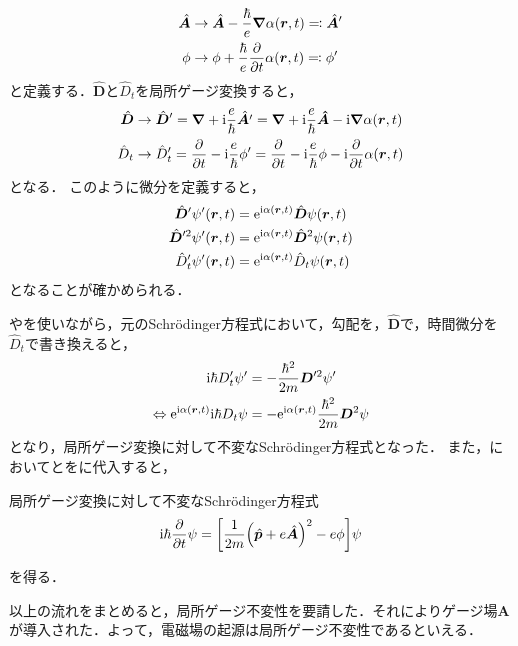 \documentclass{report}
\begin{document}
  \begin{align}
    \hat{\bm{A}} &\to \hat{\bm{A}} - \frac{\hbar}{e}\grad\alpha(\bm{r}, t) \eqqcolon \hat{\bm{A}}' \\ 
    \phi &\to \phi + \frac{\hbar}{e}\pdv{t}\alpha(\bm{r}, t) \eqqcolon \phi'  
  \end{align}
  と定義する．$\hat{\bm{D}}$と$\hat{D}_t$を局所ゲージ変換すると，
  \begin{align}
    \hat{\bm{D}} &\to \hat{\bm{D}}' = \grad + \mathrm{i}\frac{e}{\hbar}\hat{\bm{A}'} = \grad + \mathrm{i}\frac{e}{\hbar}\bm{\hat{A}} - \mathrm{i}\grad\alpha(\bm{r}, t) \\ 
    \hat{D}_t &\to \hat{D}_t' = \pdv{t} - \mathrm{i}\frac{e}{\hbar}\phi' = \pdv{t} - \mathrm{i}\frac{e}{\hbar}\phi - \mathrm{i}\pdv{t}\alpha(\bm{r}, t)
  \end{align}
  となる．
  このように微分を定義すると，
  \begin{align}
    \hat{\bm{D}}'\psi'(\bm{r}, t) &= \mathrm{e}^{\mathrm{i}\alpha(\bm{r}, t)}\hat{\bm{D}}\psi(\bm{r}, t) \label{d-prime}\\ 
    \hat{\bm{D}}'^2\psi'(\bm{r}, t) &= \mathrm{e}^{\mathrm{i}\alpha(\bm{r}, t)}\hat{\bm{D}}^2\psi(\bm{r}, t) \label{d-prime-power}\\ 
    \hat{D}_t'\psi'(\bm{r}, t) &= \mathrm{e}^{\mathrm{i}\alpha(\bm{r}, t)}\hat{D}_t\psi(\bm{r}, t) \label{dt-prime}
  \end{align}
  となることが確かめられる．
  \par
  やを使いながら，元のSchr\"odinger方程式において，勾配を，$\hat{\bm{D}}$で，時間微分を$\hat{D}_t$で書き換えると，
  \begin{align}
    \mathrm{i}\hbar D'_t\psi' &= -\frac{\hbar^2}{2m}\bm{D}'^2\psi' \\
    \Leftrightarrow \mathrm{e}^{\mathrm{i}\alpha(\bm{r}, t)}\mathrm{i}\hbar D_t\psi &= -\mathrm{e}^{\mathrm{i}\alpha(\bm{r}, t)}\frac{\hbar^2}{2m}\bm{D}^2\psi\label{local-gauge-psi}
  \end{align}
  となり，局所ゲージ変換に対して不変なSchrödinger方程式となった．
  また，においてとをに代入すると，
  \begin{itembox}[l]{局所ゲージ変換に対して不変なSchrödinger方程式}
    \begin{align}
      \mathrm{i}\hbar\pdv{t}\psi = \qty[\frac{1}{2m}\qty(\hat{\bm{p}} + e\hat{\bm{A}})^2 - e\phi]\psi
    \end{align}
  \end{itembox}
  を得る．
  \par
  以上の流れをまとめると，局所ゲージ不変性を要請した．それによりゲージ場$\bm{A}$が導入された．よって，電磁場の起源は局所ゲージ不変性であるといえる．
\end{document}
